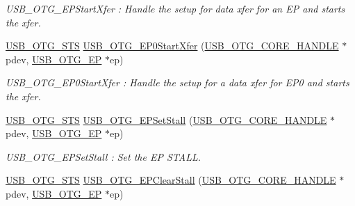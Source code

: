 \begin{DoxyCompactItemize}
\begin{DoxyCompactList}\small\item\em U\-S\-B\-\_\-\-O\-T\-G\-\_\-\-E\-P\-Start\-Xfer \-: Handle the setup for data xfer for an E\-P and starts the xfer. \end{DoxyCompactList}\item 
\hyperlink{group___u_s_b___c_o_r_e___exported___types_ga8b6504b9af0662f17515795db0f9c8ed}{U\-S\-B\-\_\-\-O\-T\-G\-\_\-\-S\-T\-S} \hyperlink{group___u_s_b___c_o_r_e___exported___functions_prototype_ga83dd7875670235649b054674bfeba616}{U\-S\-B\-\_\-\-O\-T\-G\-\_\-\-E\-P0\-Start\-Xfer} (\hyperlink{group___u_s_b___c_o_r_e___exported___types_gaf76054c11eb8a3367907aad7ae700e80}{U\-S\-B\-\_\-\-O\-T\-G\-\_\-\-C\-O\-R\-E\-\_\-\-H\-A\-N\-D\-L\-E} $\ast$pdev, \hyperlink{group___u_s_b___c_o_r_e___exported___types_gad1c65925021e8dac88858e10bb2a7eea}{U\-S\-B\-\_\-\-O\-T\-G\-\_\-\-E\-P} $\ast$ep)
\begin{DoxyCompactList}\small\item\em U\-S\-B\-\_\-\-O\-T\-G\-\_\-\-E\-P0\-Start\-Xfer \-: Handle the setup for a data xfer for E\-P0 and starts the xfer. \end{DoxyCompactList}\item 
\hyperlink{group___u_s_b___c_o_r_e___exported___types_ga8b6504b9af0662f17515795db0f9c8ed}{U\-S\-B\-\_\-\-O\-T\-G\-\_\-\-S\-T\-S} \hyperlink{group___u_s_b___c_o_r_e___exported___functions_prototype_ga92d70fb5830b52c03bc218b3ad3cdef4}{U\-S\-B\-\_\-\-O\-T\-G\-\_\-\-E\-P\-Set\-Stall} (\hyperlink{group___u_s_b___c_o_r_e___exported___types_gaf76054c11eb8a3367907aad7ae700e80}{U\-S\-B\-\_\-\-O\-T\-G\-\_\-\-C\-O\-R\-E\-\_\-\-H\-A\-N\-D\-L\-E} $\ast$pdev, \hyperlink{group___u_s_b___c_o_r_e___exported___types_gad1c65925021e8dac88858e10bb2a7eea}{U\-S\-B\-\_\-\-O\-T\-G\-\_\-\-E\-P} $\ast$ep)
\begin{DoxyCompactList}\small\item\em U\-S\-B\-\_\-\-O\-T\-G\-\_\-\-E\-P\-Set\-Stall \-: Set the E\-P S\-T\-A\-L\-L. \end{DoxyCompactList}\item 
\hyperlink{group___u_s_b___c_o_r_e___exported___types_ga8b6504b9af0662f17515795db0f9c8ed}{U\-S\-B\-\_\-\-O\-T\-G\-\_\-\-S\-T\-S} \hyperlink{group___u_s_b___c_o_r_e___exported___functions_prototype_gac6e4d998ca2bcc13026de440fdc7ab2d}{U\-S\-B\-\_\-\-O\-T\-G\-\_\-\-E\-P\-Clear\-Stall} (\hyperlink{group___u_s_b___c_o_r_e___exported___types_gaf76054c11eb8a3367907aad7ae700e80}{U\-S\-B\-\_\-\-O\-T\-G\-\_\-\-C\-O\-R\-E\-\_\-\-H\-A\-N\-D\-L\-E} $\ast$pdev, \hyperlink{group___u_s_b___c_o_r_e___exported___types_gad1c65925021e8dac88858e10bb2a7eea}{U\-S\-B\-\_\-\-O\-T\-G\-\_\-\-E\-P} $\ast$ep)

\end{DoxyCompactItemize}
